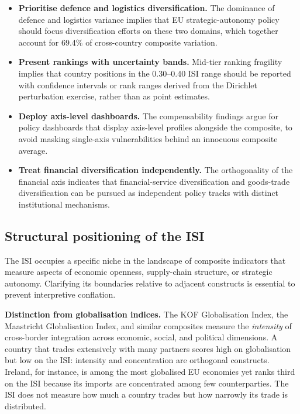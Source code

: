 \begin{itemize}[leftmargin=2em]
  \item \textbf{Prioritise defence and logistics diversification.}
    The dominance of defence and logistics variance implies that
    EU strategic-autonomy policy should focus diversification
    efforts on these two domains, which together account for
    69.4\% of cross-country composite variation.
  \item \textbf{Present rankings with uncertainty bands.}
    Mid-tier ranking fragility implies that country positions
    in the 0.30--0.40 ISI range should be reported with
    confidence intervals or rank ranges derived from the
    Dirichlet perturbation exercise, rather than as point
    estimates.
  \item \textbf{Deploy axis-level dashboards.}
    The compensability findings argue for policy dashboards
    that display axis-level profiles alongside the composite,
    to avoid masking single-axis vulnerabilities behind an
    innocuous composite average.
  \item \textbf{Treat financial diversification independently.}
    The orthogonality of the financial axis indicates that
    financial-service diversification and goods-trade
    diversification can be pursued as independent policy
    tracks with distinct institutional mechanisms.
\end{itemize}

\subsection{Structural positioning of the ISI}\label{sec:structural-positioning}

The ISI occupies a specific niche in the landscape of composite
indicators that measure aspects of economic openness, supply-chain
structure, or strategic autonomy.  Clarifying its boundaries relative
to adjacent constructs is essential to prevent interpretive conflation.

\textbf{Distinction from globalisation indices.}  The KOF
Globalisation Index, the Maastricht Globalisation Index, and similar
composites measure the \emph{intensity} of cross-border integration
across economic, social, and political dimensions.  A country that
trades extensively with many partners scores high on globalisation but
low on the ISI: intensity and concentration are orthogonal constructs.
Ireland, for instance, is among the most globalised EU economies yet
ranks third on the ISI because its imports are concentrated among few
counterparties.  The ISI does not measure how much a country trades
but how narrowly its trade is distributed.

